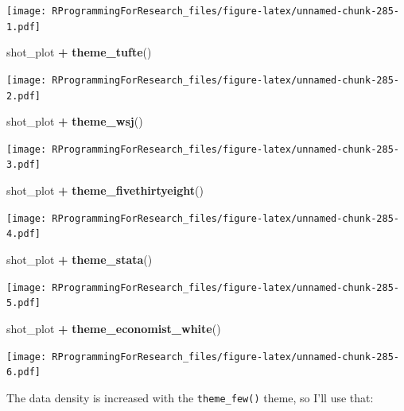 \documentclass[]{book}
\makeatletter
\newenvironment{Shaded}{\begin{snugshade}}{\end{snugshade}}
\newcommand{\KeywordTok}[1]{\textcolor[rgb]{0.13,0.29,0.53}{\textbf{#1}}}
\newcommand{\StringTok}[1]{\textcolor[rgb]{0.31,0.60,0.02}{#1}}
\newcommand{\OperatorTok}[1]{\textcolor[rgb]{0.81,0.36,0.00}{\textbf{#1}}}
\newcommand{\NormalTok}[1]{#1}
\newenvironment{kframe}{%
\medskip{}
\setlength{\fboxsep}{.8em}
 \def\at@end@of@kframe{}%
 \ifinner\ifhmode%
  \def\at@end@of@kframe{\end{minipage}}%
  \begin{minipage}{\columnwidth}%
 \fi\fi%
 \def\FrameCommand##1{\hskip\@totalleftmargin \hskip-\fboxsep
 \colorbox{shadecolor}{##1}\hskip-\fboxsep
     \hskip-\linewidth \hskip-\@totalleftmargin \hskip\columnwidth}%
 \MakeFramed {\advance\hsize-\width
   \@totalleftmargin\z@ \linewidth\hsize
   \@setminipage}}%
 {\par\unskip\endMakeFramed%
 \at@end@of@kframe}
\renewenvironment{Shaded}{\begin{kframe}}{\end{kframe}}
\theoremstyle{definition}
\theoremstyle{definition}
\theoremstyle{definition}
\theoremstyle{remark}
\makeatother
\begin{document}
\texttt{[image: RProgrammingForResearch\_files/figure-latex/unnamed-chunk-285-1.pdf]}

\begin{Shaded}
\begin{Highlighting}[]
\NormalTok{shot_plot }\OperatorTok{+}\StringTok{ }\KeywordTok{theme_tufte}\NormalTok{()}
\end{Highlighting}
\end{Shaded}

\texttt{[image: RProgrammingForResearch\_files/figure-latex/unnamed-chunk-285-2.pdf]}

\begin{Shaded}
\begin{Highlighting}[]
\NormalTok{shot_plot }\OperatorTok{+}\StringTok{ }\KeywordTok{theme_wsj}\NormalTok{()}
\end{Highlighting}
\end{Shaded}

\texttt{[image: RProgrammingForResearch\_files/figure-latex/unnamed-chunk-285-3.pdf]}

\begin{Shaded}
\begin{Highlighting}[]
\NormalTok{shot_plot }\OperatorTok{+}\StringTok{ }\KeywordTok{theme_fivethirtyeight}\NormalTok{()}
\end{Highlighting}
\end{Shaded}

\texttt{[image: RProgrammingForResearch\_files/figure-latex/unnamed-chunk-285-4.pdf]}

\begin{Shaded}
\begin{Highlighting}[]
\NormalTok{shot_plot }\OperatorTok{+}\StringTok{ }\KeywordTok{theme_stata}\NormalTok{()}
\end{Highlighting}
\end{Shaded}

\texttt{[image: RProgrammingForResearch\_files/figure-latex/unnamed-chunk-285-5.pdf]}

\begin{Shaded}
\begin{Highlighting}[]
\NormalTok{shot_plot }\OperatorTok{+}\StringTok{ }\KeywordTok{theme_economist_white}\NormalTok{()}
\end{Highlighting}
\end{Shaded}

\texttt{[image: RProgrammingForResearch\_files/figure-latex/unnamed-chunk-285-6.pdf]}

The data density is increased with the \texttt{theme\_few()} theme, so
I'll use that:
\end{document}
